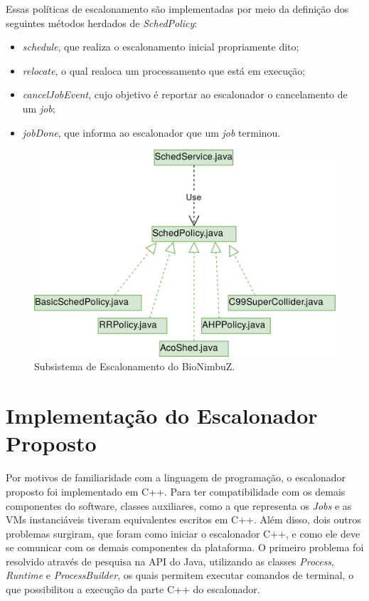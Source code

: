 Essas políticas de escalonamento são implementadas por meio da definição dos seguintes métodos herdados de \textit{SchedPolicy}:
\begin{itemize}
	\item \textit{schedule}, que realiza o escalonamento inicial propriamente dito;
	\item \textit{relocate}, o qual realoca um processamento que está em execução;
	\item \textit{cancelJobEvent}, cujo objetivo é reportar ao escalonador o cancelamento de um \textit{job};
	\item \textit{jobDone}, que informa ao escalonador que um \textit{job} terminou.
\end{itemize}

\begin{figure}[htbp]
	\centerline{\includegraphics[width=12cm]{img/ArquiteturaAntesHoriz.png}}
	\caption{Subsistema de Escalonamento do BioNimbuZ.}
	\label{ArquiteturaAtual}
\end{figure}


\section{Implementação do Escalonador Proposto}

Por motivos de familiaridade com a linguagem de programação, o escalonador proposto foi implementado em C++. Para ter compatibilidade com os demais componentes do software, classes auxiliares, como a que representa os \textit{Jobs} e as \acrshort{VM}s instanciáveis tiveram equivalentes escritos em C++. Além disso, dois outros problemas surgiram, que foram como iniciar o escalonador C++, e como ele deve se comunicar com os demais componentes da plataforma. O primeiro problema foi resolvido através de pesquisa na \acrfull{API} do Java, utilizando as classes \textit{Process}\cite{JavaProcess}, \textit{Runtime}\cite{JavaRuntime} e \textit{ProcessBuilder}\cite{JavaProcessBuilder}, os quais permitem executar comandos de terminal, o que possibilitou a execução da parte C++ do escalonador.

